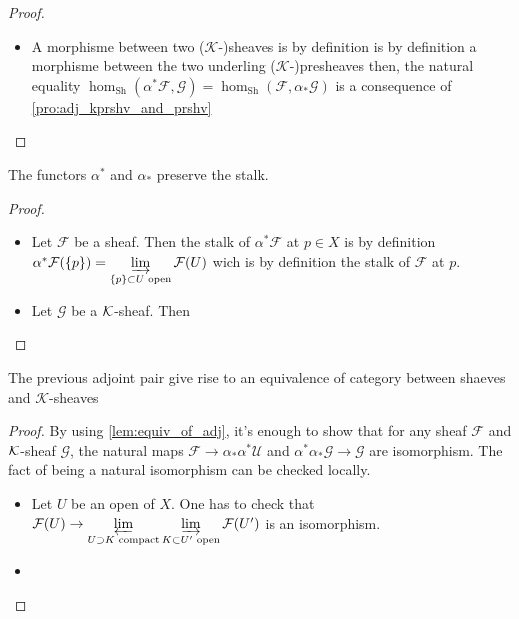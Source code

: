 \begin{proof}
\begin{itemize}
        \item A morphisme between two ($\mathcal{K}$-)sheaves is by definition is by definition a morphisme between the two underling ($\mathcal{K}$-)presheaves then, the natural equality $\hom_{\text{Sh}}(\alpha^*\mathcal{F},\mathcal{G})=\hom_{\text{Sh}}(\mathcal{F},\alpha_*\mathcal{G})$ is a consequence of \ref{pro:adj_kprshv_and_prshv}
    \end{itemize}
\end{proof}

\begin{lemma}\label{lem:stalk_preserve}
    The functors $\alpha^*$ and $\alpha_*$ preserve the stalk.
\end{lemma}

\begin{proof}
    \begin{itemize}
        \item Let $\mathcal{F}$ be a sheaf. Then the stalk of $\alpha^*\mathcal{F}$ at $p\in X$ is by definition $\alpha^*\mathcal{F}(\{p\})=\varinjlim\limits_{\{p\}\subset U \text{ open}}\mathcal{F}(U)$ wich is by definition the stalk of $\mathcal{F}$ at $p$.
        \item Let $\mathcal{G}$ be a $\mathcal{K}$-sheaf. Then 
    \end{itemize}




\end{proof}


\begin{lemma}\label{lem:kshv_equiv_shv}
    The previous adjoint pair give rise to an equivalence of category between shaeves and $\mathcal{K}$-sheaves
\end{lemma}

\begin{proof}
    By using \ref{lem:equiv_of_adj}, it's enough to show that for any sheaf $\mathcal{F}$ and $\mathcal{K}$-sheaf $\mathcal{G}$, the natural maps $\mathcal{F}\to \alpha_*\alpha^*\mathcal{U}$ and $\alpha^*\alpha_*\mathcal{G}\to \mathcal{G}$ are isomorphism. The fact of being a natural isomorphism can be checked locally.\begin{itemize}
        \item Let $U$ be an open of $X$. One has to check that $\mathcal{F}(U)\to \varprojlim\limits_{U\supset K \text{ compact}}\varinjlim\limits_{K\subset U' \text{ open}}\mathcal{F}(U')$ is an isomorphism.
        \item
    \end{itemize}
\end{proof}